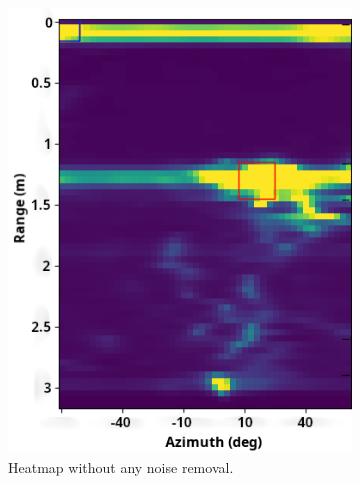 \begin{figure}[t]
\begin{subfigure}{.45\textwidth}
  \centering
  \includegraphics[width=.9\linewidth]{figures/people_detection/heatmap_no_filtering2_crop_axis.png}  
  \caption{Heatmap without any noise removal.}
  \label{fig:no_noise_removal}
\end{subfigure}
\begin{subfigure}{.45\textwidth}
  \centering

\end{subfigure}
\end{figure}

